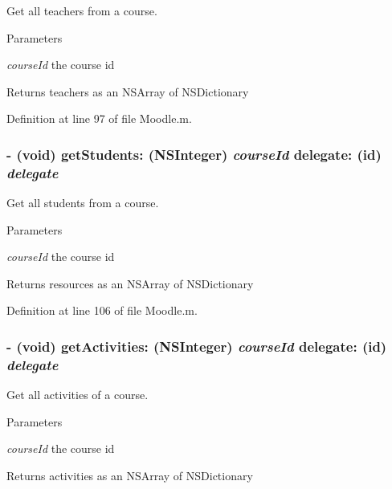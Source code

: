 Get all teachers from a course. 
\begin{DoxyParams}{Parameters}
\item[{\em courseId}]the course id \end{DoxyParams}
\begin{DoxyReturn}{Returns}
teachers as an NSArray of NSDictionary 
\end{DoxyReturn}


Definition at line 97 of file Moodle.m.\hypertarget{interface_moodle_a5e8d12f26f66b20f27021cddbca69e4d}{
\subsubsection[{getStudents:delegate:}]{\setlength{\rightskip}{0pt plus 5cm}-\/ (void) getStudents: (NSInteger) {\em courseId}\/ delegate: (id) {\em delegate}}}
\label{interface_moodle_a5e8d12f26f66b20f27021cddbca69e4d}


Get all students from a course. 
\begin{DoxyParams}{Parameters}
\item[{\em courseId}]the course id \end{DoxyParams}
\begin{DoxyReturn}{Returns}
resources as an NSArray of NSDictionary 
\end{DoxyReturn}


Definition at line 106 of file Moodle.m.\hypertarget{interface_moodle_ad769405bd0d258ad32c1f4d247b54d57}{
\subsubsection[{getActivities:delegate:}]{\setlength{\rightskip}{0pt plus 5cm}-\/ (void) getActivities: (NSInteger) {\em courseId}\/ delegate: (id) {\em delegate}}}
\label{interface_moodle_ad769405bd0d258ad32c1f4d247b54d57}


Get all activities of a course. 
\begin{DoxyParams}{Parameters}
\item[{\em courseId}]the course id \end{DoxyParams}
\begin{DoxyReturn}{Returns}
activities as an NSArray of NSDictionary 
\end{DoxyReturn}


